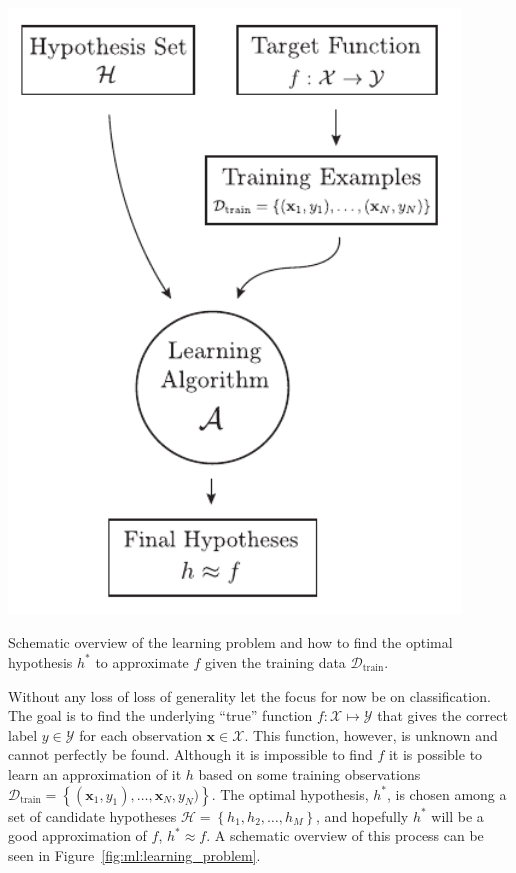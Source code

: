 \documentclass[a4paper, twoside, nobib]{tufte-book}
\newcommand{\q}[1]{``#1''}
\renewcommand{\vec}[1]{\mathbf{#1}}
\begin{document}
\begin{marginfigure}
  \includegraphics[width=0.9\textwidth]{figures/learning_problem/learning_problem.pdf}
  \caption[Schematic overview of the learning problem.]
    {Schematic overview of the learning problem and how to find the optimal hypothesis $h^*$ to approximate $f$ given the training data $\mathcal{D}_\mathrm{train}$.
    }
  \label{fig:ml:learning_problem}
\end{marginfigure}

Without any loss of loss of generality let the focus for now be on classification. The goal is to find the underlying \q{true} function $f: \mathcal{X} \mapsto \mathcal{Y}$ that gives the correct label $y\in\mathcal{Y}$ for each observation $\vec{x}\in\mathcal{X}$. This function, however, is unknown and cannot perfectly be found. Although it is impossible to find $f$ it is possible to learn an approximation of it $h$ based on some training observations $\mathcal{D}_\mathrm{train} = \left \{(\vec{x}_1, y_1), \dots, \vec{x}_N, y_N) \right\}$. The optimal hypothesis, $h^*$, is chosen among a set of candidate hypotheses $\mathcal{H} = \left\{h_1, h_2, \ldots, h_M  \right\}$, and hopefully $h^*$ will be a good approximation of $f$, $h^* \approx f$. A schematic overview of this process can be seen in Figure~\ref{fig:ml:learning_problem}. 
\end{document}
